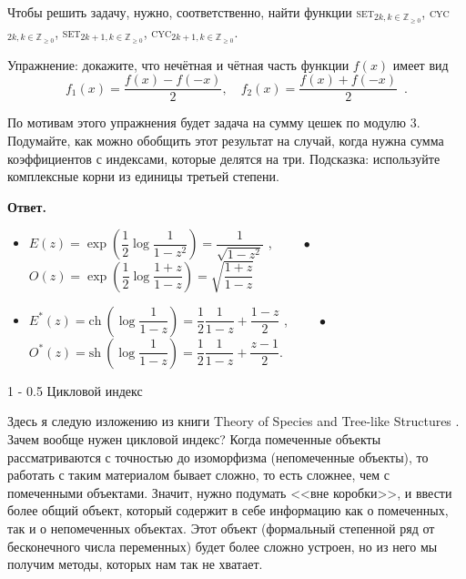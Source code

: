 \documentclass{article}
\makeatletter
\theoremstyle{definition}
\renewcommand{\section}{\@startsection
{section}%
{1}%
{\z@}%
{-\baselineskip}%
{0.5\baselineskip}%
{\centering\large\scshape}} %
\makeatother
\begin{document}
Чтобы решить задачу, нужно, соответственно, найти функции
\textsc{set}$_{2k, k \in \mathbb Z_{\geq 0}}$, \textsc{cyc}$_{2k, k \in \mathbb Z_{\geq 0}}$,
\textsc{set}$_{2k + 1, k \in \mathbb Z_{\geq 0}}$, \textsc{cyc}$_{2k + 1, k \in \mathbb
Z_{\geq 0}}$.

Упражнение: докажите, что нечётная и чётная часть функции \( f(x) \) имеет вид
\[
    f_{1}(x) = \dfrac{f(x) - f(-x)}{2}, \quad
    f_{2}(x) = \dfrac{f(x) + f(-x)}{2} \enspace . 
\]

По мотивам этого упражнения будет задача на сумму цешек по модулю 3. Подумайте,
как можно обобщить этот результат на случай, когда нужна сумма коэффициентов с
индексами, которые делятся на три. Подсказка: используйте комплексные корни из
единицы третьей степени.

\textbf{Ответ.}

\begin{itemize}
	\item \( E(z) = \exp\left(\dfrac12 \log \dfrac{1}{1-z^2}\right) = 
	\dfrac{1}{\sqrt{1 - z^2}} \) , 
	\( \qquad \bullet \) \( O(z) = \exp\left(\dfrac12 \log 
	\dfrac{1+z}{1-z}\right) = 
	\sqrt{\dfrac{1+z}{1-z}} \)
	\item \( E^{*}(z) = \mathrm{ch}\ \left(\log \dfrac{1}{1 - z}\right) = 
	\dfrac12 \dfrac{1}{1 - z} + \dfrac{1 - z}{2} \) , \( \qquad \bullet \)
	\( O^{*}(z) = \mathrm{sh}\ \left( \log \dfrac{1}{1 - z}\right) = 
	\dfrac12\dfrac{1}{1 - z} + \dfrac{z - 1}{2} \).
\end{itemize}

\section{Цикловой индекс}

Здесь я следую изложению из книги Theory of Species and Tree-like Structures 
\cite{species}. Зачем вообще нужен цикловой индекс? Когда помеченные
объекты рассматриваются с точностью до изоморфизма (непомеченные объекты), то
работать с таким материалом бывает сложно, то есть сложнее, чем с помеченными
объектами. Значит, нужно подумать <<вне коробки>>, и ввести более общий объект,
который содержит в себе информацию как о помеченных, так и о непомеченных
объектах. Этот объект (формальный степенной ряд от бесконечного числа
переменных) будет более сложно устроен, но из него мы получим методы, которых
нам так не хватает.
\end{document}
